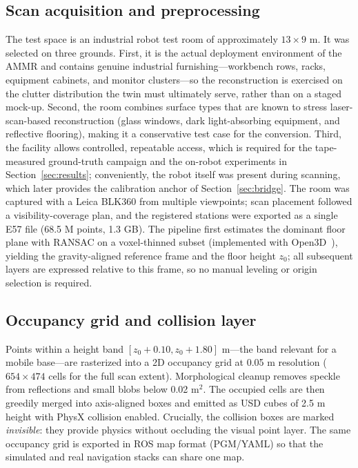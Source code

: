 \documentclass[conference]{IEEEtran}
\begin{document}
\subsection{Scan acquisition and preprocessing}
\label{sec:preproc}
The test space is an industrial robot test room of approximately
$13\times9$ m. It was selected on three grounds. First, it is the
actual deployment environment of the AMMR and contains genuine
industrial furnishing---workbench rows, racks, equipment cabinets,
and monitor clusters---so the reconstruction is exercised on the
clutter distribution the twin must ultimately serve, rather than on a
staged mock-up. Second, the room combines surface types that are
known to stress laser-scan-based reconstruction (glass windows,
dark light-absorbing equipment, and reflective flooring), making it a
conservative test case for the conversion. Third, the facility
allows controlled, repeatable access, which is required for the
tape-measured ground-truth campaign and the on-robot experiments in
Section~\ref{sec:results}; conveniently, the robot itself was present
during scanning, which later provides the calibration anchor of
Section~\ref{sec:bridge}. The room was captured with a Leica BLK360
from multiple viewpoints; scan placement followed a
visibility-coverage plan, and the registered stations were exported
as a single E57 file (68.5 M points, 1.3 GB). The pipeline first estimates the dominant floor plane with
RANSAC on a voxel-thinned subset (implemented with
Open3D~\cite{open3d}), yielding the gravity-aligned
reference frame and the floor height $z_0$; all subsequent layers are
expressed relative to this frame, so no manual leveling or origin
selection is required.

\subsection{Occupancy grid and collision layer}
\label{sec:occgrid}
Points within a height band $[z_0{+}0.10, z_0{+}1.80]$ m---the band
relevant for a mobile base---are rasterized into a 2D occupancy grid at
0.05 m resolution ($654\times474$ cells for the full scan extent).
Morphological cleanup removes speckle from reflections and small
blobs below 0.02 m$^2$. The occupied cells are then greedily merged
into axis-aligned boxes and emitted as USD cubes of 2.5 m height with
PhysX collision enabled. Crucially, the collision boxes are marked
\emph{invisible}: they provide physics without occluding the visual
point layer. The same occupancy grid is exported in ROS map format
(PGM/YAML) so that the simulated and real navigation stacks can share
one map.
\end{document}
